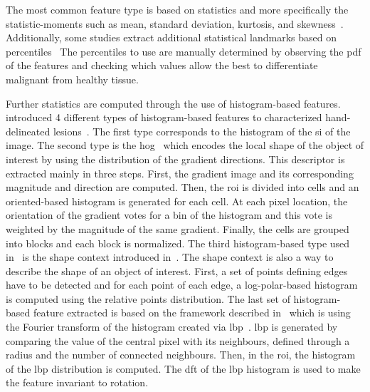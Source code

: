 The most common feature type is based on statistics and more specifically the statistic-moments such as mean, standard deviation, kurtosis, and skewness~\cite{Ampeliotis2007,Ampeliotis2008,Tiwari2009a,Tiwari2010,Tiwari2013,Viswanath2008,Viswanath2009,Viswanath2012,rampun2016quantitative,rampun2015computer,rampun2016computer,Antic2013,Viswanath2011,Peng2013,cameron2014multiparametric,cameron2016maps,khalvati2015automated,chung2015prostate,Litjens2011,Litjens2012,Litjens2014,Niaf2011,Niaf2012,lehaire2014computer}.
Additionally, some studies extract additional statistical landmarks based on percentiles~\cite{Vos2008a,Antic2013,Peng2013,Vos2010,Litjens2011,Litjens2012,Litjens2014,Niaf2011,Niaf2012,Vos2012,lehaire2014computer}
The percentiles to use are manually determined by observing the \ac{pdf} of the features and checking which values allow the best to differentiate malignant from healthy tissue.

Further statistics are computed through the use of histogram-based features.
\citeauthor{Liu2013} introduced 4 different types of histogram-based features to characterized hand-delineated lesions~\cite{Liu2013}.
The first type corresponds to the histogram of the \ac{si} of the image.
The second type is the \ac{hog}~\cite{Dalal2005} which encodes the local shape of the object of interest by using the distribution of the gradient directions.
This descriptor is extracted mainly in three steps.
First, the gradient image and its corresponding magnitude and direction are computed.
Then, the \ac{roi} is divided into cells and an oriented-based histogram is generated for each cell.
At each pixel location, the orientation of the gradient votes for a bin of the histogram and this vote is weighted by the magnitude of the same gradient.
Finally, the cells are grouped into blocks and each block is normalized.
The third histogram-based type used in~\cite{Liu2013} is the shape context introduced in~\cite{Belongie2002}.
The shape context is also a way to describe the shape of an object of interest.
First, a set of points defining edges have to be detected and for each point of each edge, a log-polar-based histogram is computed using the relative points distribution.
The last set of histogram-based feature extracted is based on the framework described in~\cite{Zhao2012} which is using the Fourier transform of the histogram created via \acf{lbp}~\cite{Ojala1996}.
\Ac{lbp} is generated by comparing the value of the central pixel with its neighbours, defined through a radius and the number of connected neighbours.
Then, in the \ac{roi}, the histogram of the \ac{lbp} distribution is computed.
The \acf{dft} of the \ac{lbp} histogram is used to make the feature invariant to rotation.

